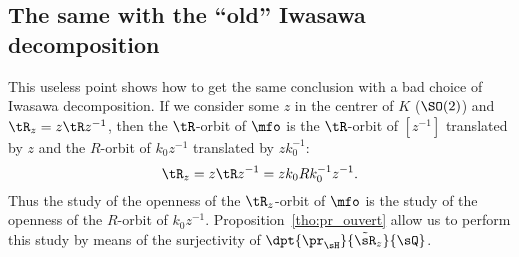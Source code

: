 \subsection{The same with the  ``old'' Iwasawa decomposition}

This useless point shows how to get the same conclusion with a bad choice of Iwasawa decomposition. If we consider some $z$ in the centrer of $K$ ($\SO(2)$) and $\tR_z=z\tR z^{-1}$, then the $\tR$-orbit of $\mfo$ is the $\tR$-orbit of $[z^{-1}]$ translated by $z$ and the $R$-orbit of $k_0z^{-1}$ translated by $zk_0^{-1}$:
\begin{equation}
	\tR_z=z\tR z^{-1}=zk_0 Rk_0^{-1} z^{-1}.
\end{equation}
Thus the study of the openness of the $\tR_z$-orbit of $\mfo$ is the study of the openness of the $R$-orbit of $k_0z^{-1}$. Proposition~\ref{tho:pr_ouvert} allow us to perform this study by means of the surjectivity of $\dpt{\pr_{\sH}}{\tilde{\sR}_z}{\sQ}$.

